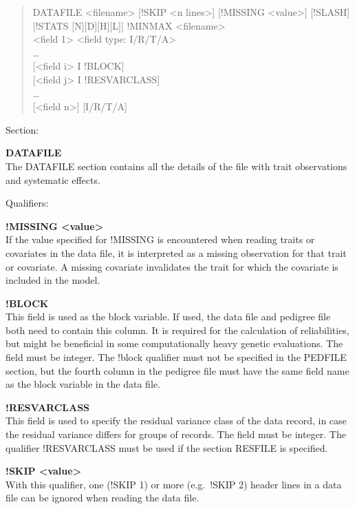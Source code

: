 \begin{quote}
DATAFILE \textless filename\textgreater{} {[}!SKIP \textless n
lines\textgreater{]} {[}!MISSING \textless value\textgreater{]}
{[}!SLASH{]} {[}!STATS {[}N{]}{[}D{]}{[}H{]}{[}L{]}{]} !MINMAX
\textless filename\textgreater{}\\
\textless field 1\textgreater{} \textless field type:
I/R/T/A\textgreater{}\\
\ldots{}\\
{[}\textless field i\textgreater{} I !BLOCK{]}\\
{[}\textless field j\textgreater{} I !RESVARCLASS{]}\\
\ldots{}\\
{[}\textless field n\textgreater{]} {[}I/R/T/A{]}
\end{quote}

Section:

\textbf{DATAFILE}\\
The DATAFILE section contains all the details of the file with trait
observations and systematic effects.

Qualifiers:

\textbf{!MISSING \textless value\textgreater{}}\\
If the value specified for !MISSING is encountered when reading traits
or covariates in the data file, it is interpreted as a missing
observation for that trait or covariate. A missing covariate invalidates
the trait for which the covariate is included in the model.

\textbf{!BLOCK}\\
This field is used as the block variable. If used, the data file and
pedigree file both need to contain this column. It is required for the
calculation of reliabilities, but might be beneficial in some
computationally heavy genetic evaluations. The field must be integer.
The !block qualifier must not be specified in the PEDFILE section, but
the fourth column in the pedigree file must have the same field name as
the block variable in the data file.

\textbf{!RESVARCLASS}\\
This field is used to specify the residual variance class of the data
record, in case the residual variance differs for groups of records. The
field must be integer. The qualifier !RESVARCLASS must be used if the
section RESFILE is specified.

\textbf{!SKIP \textless value\textgreater{}}\\
With this qualifier, one (!SKIP 1) or more (e.g.~!SKIP 2) header lines
in a data file can be ignored when reading the data file.

